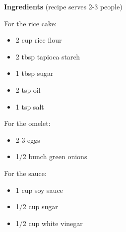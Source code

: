 \documentclass[
]{book}
\providecommand{\tightlist}{%
  \setlength{\itemsep}{0pt}\setlength{\parskip}{0pt}}
\begin{document}
\begin{blackbox}

\textbf{Ingredients} (recipe serves 2-3 people)

For the rice cake:

\begin{itemize}
\tightlist
\item
  2 cup rice flour
\item
  2 tbsp tapioca starch
\item
  1 tbsp sugar
\item
  2 tsp oil
\item
  1 tsp salt
\end{itemize}

For the omelet:

\begin{itemize}
\tightlist
\item
  2-3 eggs
\item
  1/2 bunch green onions
\end{itemize}

For the sauce:

\begin{itemize}
\tightlist
\item
  1 cup soy sauce
\item
  1/2 cup sugar
\item
  1/2 cup white vinegar
\end{itemize}

\end{blackbox}
\end{document}
